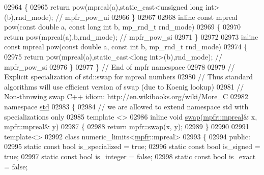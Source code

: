 \begin{DoxyCode}
{{02964 \{
02965     \textcolor{keywordflow}{return} pow(mpreal(a),static\_cast<unsigned long int>(b),rnd\_mode); \textcolor{comment}{// mpfr\_pow\_ui}
02966 \}
02967 
02968 \textcolor{keyword}{inline} \textcolor{keyword}{const} mpreal pow(\textcolor{keyword}{const} \textcolor{keywordtype}{double} a, \textcolor{keyword}{const} \textcolor{keywordtype}{long} \textcolor{keywordtype}{int} b, mp\_rnd\_t rnd\_mode)
02969 \{
02970     \textcolor{keywordflow}{return} pow(mpreal(a),b,rnd\_mode); \textcolor{comment}{// mpfr\_pow\_si}
02971 \}
02972 
02973 \textcolor{keyword}{inline} \textcolor{keyword}{const} mpreal pow(\textcolor{keyword}{const} \textcolor{keywordtype}{double} a, \textcolor{keyword}{const} \textcolor{keywordtype}{int} b, mp\_rnd\_t rnd\_mode)
02974 \{
02975     \textcolor{keywordflow}{return} pow(mpreal(a),static\_cast<long int>(b),rnd\_mode); \textcolor{comment}{// mpfr\_pow\_si}
02976 \}
02977 \} \textcolor{comment}{// End of mpfr namespace}
02978 
02979 \textcolor{comment}{// Explicit specialization of std::swap for mpreal numbers}
02980 \textcolor{comment}{// Thus standard algorithms will use efficient version of swap (due to Koenig lookup)}
02981 \textcolor{comment}{// Non-throwing swap C++ idiom: http://en.wikibooks.org/wiki/More\_C%
02982 \textcolor{keyword}{namespace }\hyperlink{namespacestd}{std}
02983 \{
02984   \textcolor{comment}{// we are allowed to extend namespace std with specializations only}
02985     \textcolor{keyword}{template} <>
02986     \textcolor{keyword}{inline} \textcolor{keywordtype}{void} \hyperlink{endian_8c_a3ca5ecd34b04d6a243c054ac3a57f68d}{swap}(\hyperlink{classmpfr_1_1mpreal}{mpfr::mpreal}& x, \hyperlink{classmpfr_1_1mpreal}{mpfr::mpreal}& y)
02987     \{
02988         \textcolor{keywordflow}{return} \hyperlink{endian_8c_a3ca5ecd34b04d6a243c054ac3a57f68d}{mpfr::swap}(x, y);
02989     \}
02990 
02991     \textcolor{keyword}{template}<>
02992     \textcolor{keyword}{class }numeric\_limits<\hyperlink{namespacempfr}{mpfr}::mpreal>
02993     \{
02994     \textcolor{keyword}{public}:
02995         \textcolor{keyword}{static} \textcolor{keyword}{const} \textcolor{keywordtype}{bool} is\_specialized    = \textcolor{keyword}{true};
02996         \textcolor{keyword}{static} \textcolor{keyword}{const} \textcolor{keywordtype}{bool} is\_signed         = \textcolor{keyword}{true};
02997         \textcolor{keyword}{static} \textcolor{keyword}{const} \textcolor{keywordtype}{bool} is\_integer        = \textcolor{keyword}{false};
02998         \textcolor{keyword}{static} \textcolor{keyword}{const} \textcolor{keywordtype}{bool} is\_exact          = \textcolor{keyword}{false};
}}}
\end{DoxyCode}
